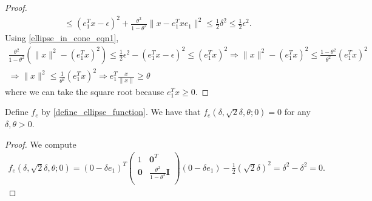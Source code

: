 \begin{proof}
\begin{align*}
\le (e_1^Tx - \epsilon)^2 + \frac{\theta^2}{1 - \theta^2}\|x - e_1^Tx e_1\|^2 \le \frac 1 2 \delta^2 \le \frac 1 2 \epsilon^2.
\end{align*}
Using \cref{ellipse_in_cone_eqn1}, 
\begin{align*}
\frac{\theta^2}{1 - \theta^2}(\|x\|^2 - (e_1^Tx)^2) \le \frac 1 2 \epsilon^2 - (e_1^Tx - \epsilon)^2 \le (e_1^Tx)^2
\Longrightarrow \|x\|^2 - (e_1^Tx)^2 \le \frac{1 - \theta^2}{\theta^2}(e_1^Tx)^2 \\
\Longrightarrow \|x\|^2 \le \frac 1 {\theta^2}(e_1^Tx)^2
\Longrightarrow e_1^T\frac{x}{\|x\|} \ge \theta
\end{align*}
where we can take the square root because $e_1^Tx \ge 0$.
\end{proof}

\begin{lemma}
\label{ellipse_fits}
Define $f_e$ by \cref{define_ellipse_function}.
We have that $f_e(\delta, \sqrt{2}\delta, \theta; 0) = 0$ for any $\delta, \theta > 0$.
\end{lemma}
\begin{proof}
We compute
\begin{align*}
f_e(\delta, \sqrt{2}\delta, \theta; 0) =(0 - \delta e_1)^T\begin{pmatrix}
1 & \boldsymbol0^T \\
\boldsymbol 0 & \frac{\theta^2}{1 - \theta^2} \boldsymbol I \\
\end{pmatrix}(0 - \delta e_1) - \frac 1 2 (\sqrt 2 \delta)^2
=\delta^2 - \delta^2 = 0.
\end{align*}
\end{proof}


